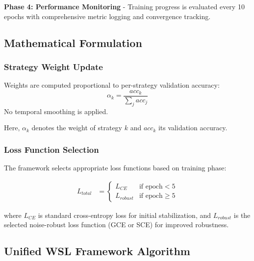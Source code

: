 \documentclass{ieeeaccess}
\begin{document}
\textbf{Phase 4: Performance Monitoring} - Training progress is evaluated every 10 epochs with comprehensive metric logging and convergence tracking.

\subsection{Mathematical Formulation}

\subsubsection{Strategy Weight Update}
Weights are computed proportional to per-strategy validation accuracy:
\begin{equation}
\alpha_k = \frac{acc_k}{\sum_j acc_j}
\label{eq:weight_update}
\end{equation}
No temporal smoothing is applied.

Here, $\alpha_k$ denotes the weight of strategy $k$ and $acc_k$ its validation accuracy.

\subsubsection{Loss Function Selection}
The framework selects appropriate loss functions based on training phase:

\begin{align}
L_{total} &= \begin{cases}
L_{CE} & \text{if epoch} < 5 \\
L_{robust} & \text{if epoch} \geq 5
\end{cases}
\label{eq:loss_selection}
\end{align}

where $L_{CE}$ is standard cross-entropy loss for initial stabilization, and $L_{robust}$ is the selected noise-robust loss function (GCE or SCE) for improved robustness.

\subsection{Unified WSL Framework Algorithm}
\end{document}
